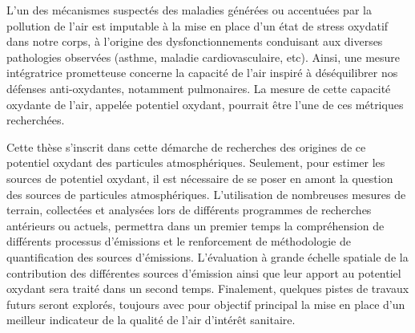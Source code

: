 L'un des mécanismes suspectés des maladies générées ou accentuées par la pollution de l'air
est imputable à la mise en place d'un état de stress oxydatif dans notre corps, à l'origine des
dysfonctionnements conduisant aux diverses pathologies observées (asthme, maladie
cardiovasculaire, etc). Ainsi, une mesure intégratrice prometteuse concerne la capacité de
l'air inspiré à déséquilibrer nos défenses anti-oxydantes, notamment pulmonaires.
La mesure de cette capacité oxydante de l'air, appelée potentiel oxydant, pourrait être
l'une de ces métriques recherchées.

Cette thèse s'inscrit dans cette démarche de recherches des origines de ce potentiel
oxydant des particules atmosphériques. Seulement, pour estimer les sources de potentiel
oxydant, il est nécessaire de se poser en amont la question des sources de particules
atmosphériques. L'utilisation de nombreuses mesures de terrain, collectées et analysées
lors de différents programmes de recherches antérieurs ou actuels, permettra dans un
premier temps la compréhension de différents processus d'émissions et le renforcement de
méthodologie de quantification des sources d'émissions. L'évaluation à grande échelle
spatiale de la contribution des différentes sources d'émission ainsi que leur apport au
potentiel oxydant sera traité dans un second temps. Finalement, quelques pistes de
travaux futurs seront explorés, toujours avec pour objectif principal la mise en place
d'un meilleur indicateur de la qualité de l'air d'intérêt sanitaire.


